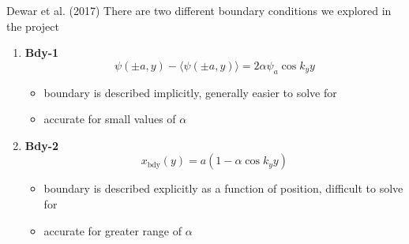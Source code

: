 \documentclass[compress]{beamer}
\begin{document}
\begin{frame}{Dewar et al. (2017) \cite{dewar2017}}
    There are two different boundary conditions we explored in the project
    \begin{enumerate}
        \item {\bf Bdy-1}
            \begin{equation}
                \label{eq:bdy1}
                \psi\left( \pm a, y \right) - \langle \psi\left( \pm a, y \right) \rangle = 2\alpha \psi_a \cos{k_y y}
            \end{equation} 
            \begin{itemize}
                \item boundary is described implicitly, generally easier to solve for
                \item accurate for small values of $\alpha$
            \end{itemize}
        \item {\bf Bdy-2}
            \begin{equation}
                \label{eq:bdy2}
                x_{\text{bdy}}\left( y \right) =a\left( 1-\alpha\cos{k_y y} \right) 
            \end{equation} 
            \begin{itemize}
                \item boundary is described explicitly as a function of position, difficult to solve for
                \item accurate for greater range of $\alpha$
            \end{itemize}

    \end{enumerate}
\end{frame}
\end{document}
